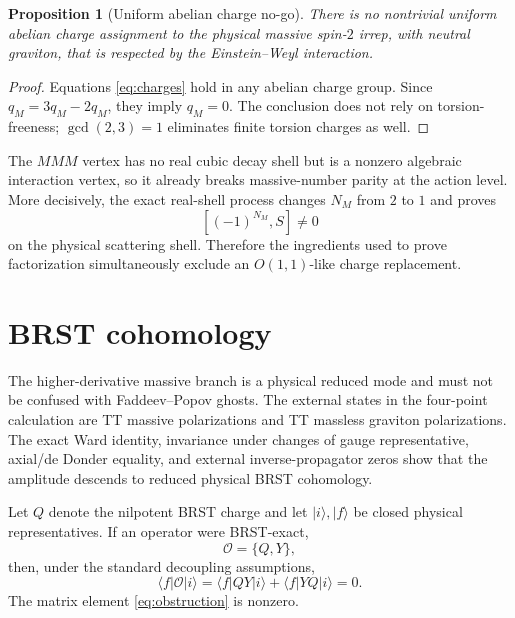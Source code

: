 \documentclass[11pt]{article}
\newtheorem{proposition}[theorem]{Proposition}
\theoremstyle{definition}
\theoremstyle{remark}
\begin{document}
\begin{proposition}[Uniform abelian charge no-go]\label{prop:chargenogo}
There is no nontrivial uniform abelian charge assignment to the physical
massive spin-$2$ irrep, with neutral graviton, that is respected by the
Einstein--Weyl interaction.
\end{proposition}

\begin{proof}
Equations \eqref{eq:charges} hold in any abelian charge group.  Since
$q_M=3q_M-2q_M$, they imply $q_M=0$.  The conclusion does not rely on
torsion-freeness; $\gcd(2,3)=1$ eliminates finite torsion charges as well.
\end{proof}

The $MMM$ vertex has no real cubic decay shell but is a nonzero algebraic
interaction vertex, so it already breaks massive-number parity at the
action level.  More decisively, the exact real-shell process changes
$N_M$ from $2$ to $1$ and proves
\begin{equation}\label{eq:paritybroken}
[(-1)^{N_M},S]\ne0
\end{equation}
on the physical scattering shell.  Therefore the ingredients used to
prove factorization simultaneously exclude an $O(1,1)$-like charge
replacement.

\section{BRST cohomology}\label{sec:brst}

The higher-derivative massive branch is a physical reduced mode and must
not be confused with Faddeev--Popov ghosts.  The external states in the
four-point calculation are TT massive polarizations and TT massless
graviton polarizations.
The exact Ward identity, invariance under changes of gauge representative,
axial/de Donder equality, and external inverse-propagator
zeros show that the amplitude descends to reduced physical BRST
cohomology.

Let $Q$ denote the nilpotent BRST charge and let $|i\rangle,|f\rangle$
be closed physical representatives.  If an operator were BRST-exact,
\begin{equation}
\mathcal O=\{Q,Y\},
\end{equation}
then, under the standard decoupling assumptions,
\begin{equation}\label{eq:brstzero}
\langle f|\mathcal O|i\rangle
=\langle f|QY|i\rangle+\langle f|YQ|i\rangle=0.
\end{equation}
The matrix element \eqref{eq:obstruction} is nonzero.
\end{document}
